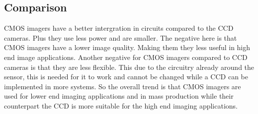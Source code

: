 \documentclass{article}
\begin{document}
\subsection{Comparison}

CMOS imagers have a better intergration in circuits compared to the CCD cameras. Plus they use less power and are smaller. The negative here is that CMOS imagers have a lower image quality. Making them they less useful in high end image applications. Another negative for CMOS imagers compared to CCD cameras is that they are less flexible. This due to the circuitry already around the sensor, this is needed for it to work and cannot be changed while a CCD can be implemented in more systems. So the overall trend is that CMOS   imagers are used for lower end imaging applications and in mass production while their counterpart the CCD is more suitable for the high end imaging applications.
\end{document}
